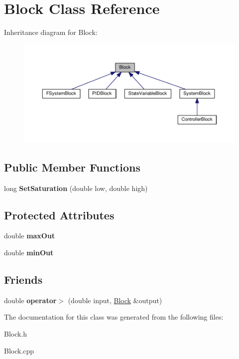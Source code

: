 \hypertarget{classBlock}{}\section{Block Class Reference}
\label{classBlock}


Inheritance diagram for Block\+:\nopagebreak
\begin{figure}[H]
\begin{center}
\leavevmode
\includegraphics[width=350pt]{classBlock__inherit__graph}
\end{center}
\end{figure}
\subsection*{Public Member Functions}
\begin{DoxyCompactItemize}
\item 
\mbox{\label{classBlock_a1a17b39aaed97e601a1b2d508f6034e3}} 
long {\bfseries Set\+Saturation} (double low, double high)
\end{DoxyCompactItemize}
\subsection*{Protected Attributes}
\begin{DoxyCompactItemize}
\item 
\mbox{\label{classBlock_a9a2c531eb53f86d1c39a819ea7f65935}} 
double {\bfseries max\+Out}
\item 
\mbox{\label{classBlock_aaad01d77bced26bca7611ae8257c73f7}} 
double {\bfseries min\+Out}
\end{DoxyCompactItemize}
\subsection*{Friends}
\begin{DoxyCompactItemize}
\item 
\mbox{\label{classBlock_aff6f40255ea5461398bb769f499016fe}} 
double {\bfseries operator$>$} (double input, \hyperlink{classBlock}{Block} \&output)
\end{DoxyCompactItemize}


The documentation for this class was generated from the following files\+:\begin{DoxyCompactItemize}
\item 
Block.\+h\item 
Block.\+cpp\end{DoxyCompactItemize}
